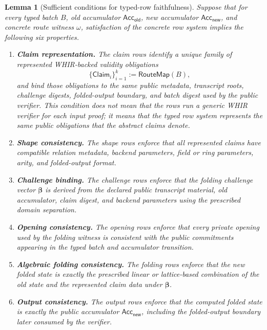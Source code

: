 \documentclass[11pt]{article}
\newtheorem{lemma}[theorem]{Lemma}
\theoremstyle{definition}
\newcommand{\Acc}{\mathsf{Acc}}
\begin{document}
\begin{lemma}[Sufficient conditions for typed-row faithfulness]
\label{lem:typed-row-faithfulness-sufficient}
Suppose that for every typed batch \(B\), old accumulator
\(\Acc_{\mathsf{old}}\), new accumulator \(\Acc_{\mathsf{new}}\), and concrete
route witness \(\omega\), satisfaction of the concrete row system implies the
following six properties.

\begin{enumerate}
  \item \textbf{Claim representation.}
  The claim rows identify a unique family of represented WHIR-backed validity
  obligations
  \[
    \{\mathsf{Claim}_i\}_{i=1}^k := \mathsf{RouteMap}(B),
  \]
  and bind those obligations to the same public metadata, transcript roots,
  challenge digests, folded-output boundary, and batch digest used by the public
  verifier. This condition does not mean that the rows run a generic WHIR
  verifier for each input proof; it means that the typed row system represents
  the same public obligations that the abstract claims denote.

  \item \textbf{Shape consistency.}
  The shape rows enforce that all represented claims have compatible relation
  metadata, backend parameters, field or ring parameters, arity, and
  folded-output format.

  \item \textbf{Challenge binding.}
  The challenge rows enforce that the folding challenge vector
  \(\boldsymbol{\beta}\) is derived from the declared public transcript material,
  old accumulator, claim digest, and backend parameters using the prescribed
  domain separation.

  \item \textbf{Opening consistency.}
  The opening rows enforce that every private opening used by the folding
  witness is consistent with the public commitments appearing in the typed batch
  and accumulator transition.

  \item \textbf{Algebraic folding consistency.}
  The folding rows enforce that the new folded state is exactly the prescribed
  linear or lattice-based combination of the old state and the represented claim
  data under \(\boldsymbol{\beta}\).

  \item \textbf{Output consistency.}
  The output rows enforce that the computed folded state is exactly the public
  accumulator \(\Acc_{\mathsf{new}}\), including the folded-output boundary later
  consumed by the verifier.
\end{enumerate}


\end{lemma}
\end{document}
